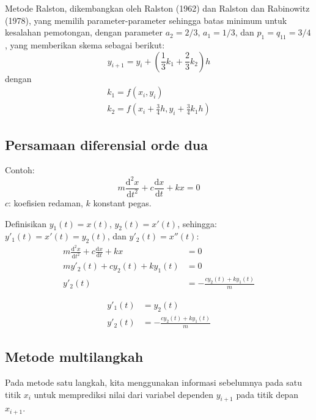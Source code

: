 Metode Ralston, dikembangkan oleh Ralston (1962) dan Ralston dan Rabinowitz (1978),
yang memilih parameter-parameter sehingga batas minimum untuk kesalahan pemotongan,
dengan parameter $a_2 = 2/3$, $a_1 = 1/3$, dan $p_1 = q_{11} = 3/4$, yang
memberikan skema sebagai berikut:
\begin{equation*}
y_{i+1} = y_i + \left( \frac{1}{3}k_1 + \frac{2}{3}k_2 \right) h
\end{equation*}
dengan
\begin{align*}
k_1 = f(x_i, y_i) \\
k_2 = f\left( x_i + \frac{3}{4}h, y_i + \frac{3}{4}k_1 h \right)
\end{align*}



\subsection*{Persamaan diferensial orde dua}

Contoh:
\begin{equation*}
m \frac{\mathrm{d}^2 x}{\mathrm{d}t^2} + c \frac{\mathrm{d}x}{\mathrm{d}t} + kx = 0
\end{equation*}
$c$: koefisien redaman, $k$ konstant pegas.

Definisikan $y_{1}(t) = x(t)$, $y_{2}(t) = x'(t)$, sehingga:
$y'_{1}(t) = x'(t) = y_{2}(t)$, dan
$y'_{2}(t) = x''(t)$:
\begin{align*}
m \frac{\mathrm{d}^2 x}{\mathrm{d}t^2} + c \frac{\mathrm{d}x}{\mathrm{d}t} + kx & = 0 \\
m y'_{2}(t) + c y_{2}(t) + k y_{1}(t) & = 0 \\
y'_{2}(t) & = -\frac{c y_{2}(t) + k y_{1}(t)}{m}
\end{align*}

\begin{align*}
y'_{1}(t) & = y_{2}(t) \\
y'_{2}(t) & = -\frac{c y_{2}(t) + k y_{1}(t)}{m}
\end{align*}


\subsection*{Metode multilangkah}

Pada metode satu langkah, kita menggunakan informasi sebelumnya pada satu titik $x_i$ untuk
memprediksi nilai dari variabel dependen $y_{i+1}$ pada titik depan $x_{i+1}$.

